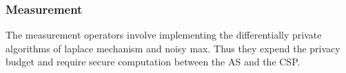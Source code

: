 \subsubsection{Measurement} The measurement operators involve implementing the differentially private algorithms of laplace mechanism and noisy max.  Thus they expend the privacy budget and require secure computation between the \textsf{AS} and the \textsf{CSP}. 

